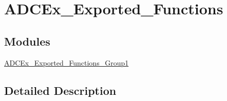 \hypertarget{group___a_d_c_ex___exported___functions}{}\section{A\+D\+C\+Ex\+\_\+\+Exported\+\_\+\+Functions}
\label{group___a_d_c_ex___exported___functions}
\subsection*{Modules}
\begin{DoxyCompactItemize}
\item 
\hyperlink{group___a_d_c_ex___exported___functions___group1}{A\+D\+C\+Ex\+\_\+\+Exported\+\_\+\+Functions\+\_\+\+Group1}
\end{DoxyCompactItemize}


\subsection{Detailed Description}
